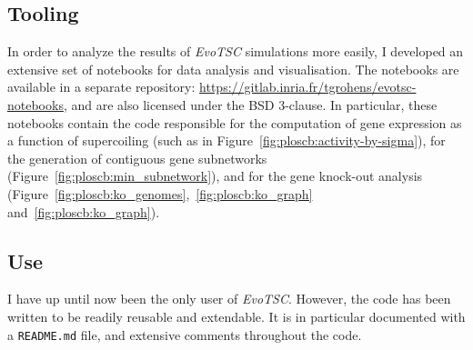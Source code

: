 \subsection{Tooling}

In order to analyze the results of \emph{EvoTSC} simulations more easily, I developed an extensive set of notebooks for data analysis and visualisation.
The notebooks are available in a separate repository: \url{https://gitlab.inria.fr/tgrohens/evotsc-notebooks}, and are also licensed under the BSD 3-clause.
In particular, these notebooks contain the code responsible for the computation of gene expression as a function of supercoiling (such as in Figure~\ref{fig:ploscb:activity-by-sigma}), for the generation of contiguous gene subnetworks (Figure~\ref{fig:ploscb:min_subnetwork}), and for the gene knock-out analysis (Figure~\ref{fig:ploscb:ko_genomes},~\ref{fig:ploscb:ko_graph} and~\ref{fig:ploscb:ko_graph}).

\subsection{Use}

I have up until now been the only user of \emph{EvoTSC}.
However, the code has been written to be readily reusable and extendable.
It is in particular documented with a \texttt{README.md} file, and extensive comments throughout the code.
